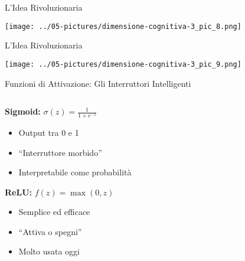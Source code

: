 \documentclass[aspectratio=169]{beamer}
\begin{document}
%
%
\begin{frame}{L'Idea Rivoluzionaria}
\begin{center}
\texttt{[image: ../05-pictures/dimensione-cognitiva-3\_pic\_8.png]} 
\end{center}
\end{frame}
%
%
\begin{frame}{L'Idea Rivoluzionaria}
\begin{center}
\texttt{[image: ../05-pictures/dimensione-cognitiva-3\_pic\_9.png]} 
\end{center}
\end{frame}
%
%
\begin{frame}{Funzioni di Attivazione: Gli Interruttori Intelligenti}

\begin{columns}
\begin{column}{0.45\textwidth}
\textbf{Sigmoid:} $\sigma(z) = \frac{1}{1+e^{-z}}$
\begin{itemize}
\item Output tra 0 e 1
\item ``Interruttore morbido''
\item Interpretabile come probabilità
\end{itemize}

\vspace{0.5cm}
\textbf{ReLU:} $f(z) = \max(0,z)$
\begin{itemize}
\item Semplice ed efficace
\item ``Attiva o spegni''
\item Molto usata oggi
\end{itemize}
\end{column}

\begin{column}{0.45\textwidth}
\begin{center}
\end{center}
\end{column}
\end{columns}

\end{frame}
\end{document}
